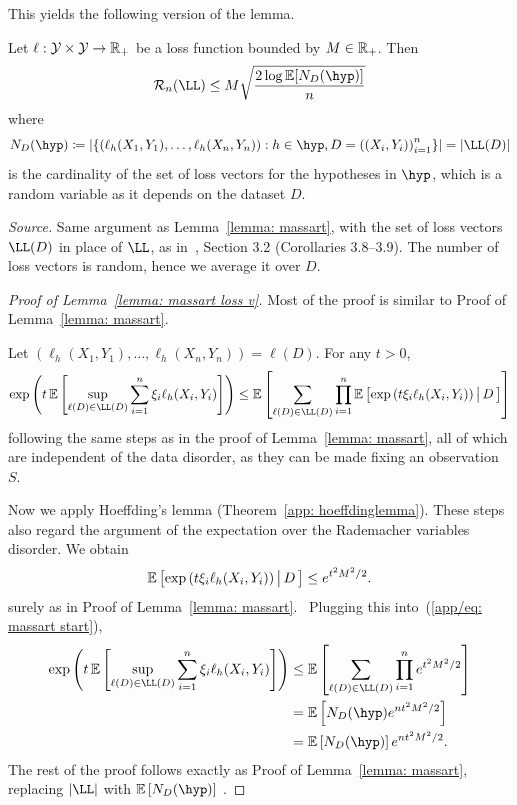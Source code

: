 \documentclass[reqno]{amsart}
\begin{document}
This yields the following version of the lemma. 
\begin{lemma}\label{lemma: massart loss v}
Let $\ell:\mathcal{Y}\times\mathcal{Y}\to\mathbb{R}_+$ be a loss function bounded by $M\in\mathbb{R}_+$. Then
\[
\mathcal R_n(\LL) \le M\sqrt{\frac{2\log \expv[N_D(\hyp)]}{n}}
\]
where \[N_D(\hyp)\coloneq \left\vert\left\{\left(\ell_h(X_1,Y_1),\ldots,\ell_h(X_n,Y_n)\right) : h\in\hyp, D = {((X_i, Y_i))}_{i=1}^n\right\}\right\vert = \left\vert \LL(D)\right\vert\] is the cardinality of the set of loss vectors for the hypotheses in $\hyp$, which is a random variable as it depends on the dataset $D$.

\textnormal{\emph{Source.} Same argument as Lemma~\ref{lemma: massart}, with the set of loss vectors $\LL(D)$ in place of $\LL$, as in~\cite{mohri2018foundations}, Section 3.2 (Corollaries 3.8--3.9). The number of loss vectors is random, hence we average it over $D$.}

\begin{proof}[Proof of Lemma~\ref{lemma: massart loss v}]
Most of the proof is similar to Proof of Lemma~\ref{lemma: massart}. 

Let $(\ell_h(X_1,Y_1),\ldots,\ell_h(X_n,Y_n)) = \ell(D)$. For any $t>0$, 
\[
\exp\left(t\,\expv\left[\sup_{\ell(D) \in \LL(D)}\sum_{i=1}^n \xi_i\ell_h(X_i,Y_i)\right]\right)\le
\expv\left[\sum_{\ell(D)\in\LL(D)}\prod_{i=1}^n \expv\left[\exp\left(t\xi_i\ell_h(X_i,Y_i)\right)\big\vert\,D\,\right]\right]
\]
following the same steps as in the proof of Lemma~\ref{lemma: massart}, all of which are independent of the data disorder, as they can be made fixing an observation $S$. 

Now we apply Hoeffding's lemma (Theorem~\ref{app: hoeffdinglemma}). These steps also regard the argument of the expectation over the Rademacher variables disorder. We obtain
\[
\mathbb{E}\left[\exp\left(t\xi_i\ell_h(X_i,Y_i)\right)\big\vert\,D\,\right] \le e^{t^2M^2/2}.
\]
surely as in Proof of Lemma~\ref{lemma: massart}. 
Plugging this into~(\ref{app/eq: massart start}),
\begin{align*}
\exp\left(t\,\expv\left[\sup_{\ell(D)\in\LL(D)}\sum_{i=1}^n \xi_i\ell_h(X_i,Y_i)\right]\right) &\le \expv\left[\sum_{\ell(D)\in\LL(D)}\prod_{i=1}^n e^{t^2M^2/2}\right]\\ &= \expv\left[N_D(\hyp)e^{nt^2M^2/2}\right] \\&= \expv\left[N_D(\hyp)\right] e^{nt^2M^2/2}.
\end{align*}
The rest of the proof follows exactly as Proof of Lemma~\ref{lemma: massart}, replacing $\vert\LL\vert$ with $\expv\left[N_D(\hyp)\right]$ .
\end{proof}
\end{lemma}
\end{document}
